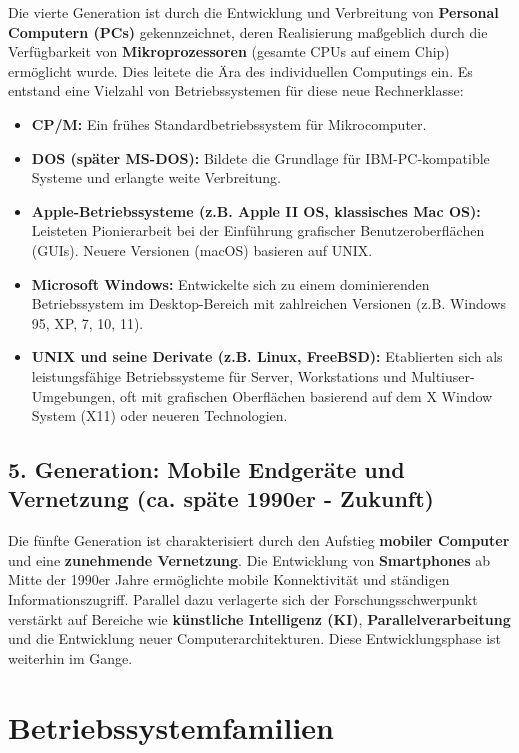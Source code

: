 Die vierte Generation ist durch die Entwicklung und Verbreitung von
\textbf{Personal Computern (PCs)} gekennzeichnet, deren Realisierung maßgeblich
durch die Verfügbarkeit von \textbf{Mikroprozessoren} (gesamte CPUs auf einem
Chip) ermöglicht wurde. Dies leitete die Ära des individuellen Computings ein.
Es entstand eine Vielzahl von Betriebssystemen für diese neue Rechnerklasse:

\begin{itemize}
    \item \textbf{CP/M:} Ein frühes Standardbetriebssystem für Mikrocomputer.
    \item \textbf{DOS (später MS-DOS):} Bildete die Grundlage für IBM-PC-kompatible Systeme und erlangte weite Verbreitung.
    \item \textbf{Apple-Betriebssysteme (z.B. Apple II OS, klassisches Mac OS):} Leisteten Pionierarbeit bei der Einführung grafischer Benutzeroberflächen (GUIs). Neuere Versionen (macOS) basieren auf UNIX.
    \item \textbf{Microsoft Windows:} Entwickelte sich zu einem dominierenden Betriebssystem im Desktop-Bereich mit zahlreichen Versionen (z.B. Windows 95, XP, 7, 10, 11).
    \item \textbf{UNIX und seine Derivate (z.B. Linux, FreeBSD):} Etablierten sich als leistungsfähige Betriebssysteme für Server, Workstations und Multiuser-Umgebungen, oft mit grafischen Oberflächen basierend auf dem X Window System (X11) oder neueren Technologien.
\end{itemize}

\subsection{5. Generation: Mobile Endgeräte und Vernetzung (ca. späte 1990er - Zukunft)}

Die fünfte Generation ist charakterisiert durch den Aufstieg \textbf{mobiler
    Computer} und eine \textbf{zunehmende Vernetzung}. Die Entwicklung von
\textbf{Smartphones} ab Mitte der 1990er Jahre ermöglichte mobile Konnektivität
und ständigen Informationszugriff. Parallel dazu verlagerte sich der
Forschungsschwerpunkt verstärkt auf Bereiche wie \textbf{künstliche Intelligenz
    (KI)}, \textbf{Parallelverarbeitung} und die Entwicklung neuer
Computerarchitekturen. Diese Entwicklungsphase ist weiterhin im Gange.

\section{Betriebssystemfamilien}

